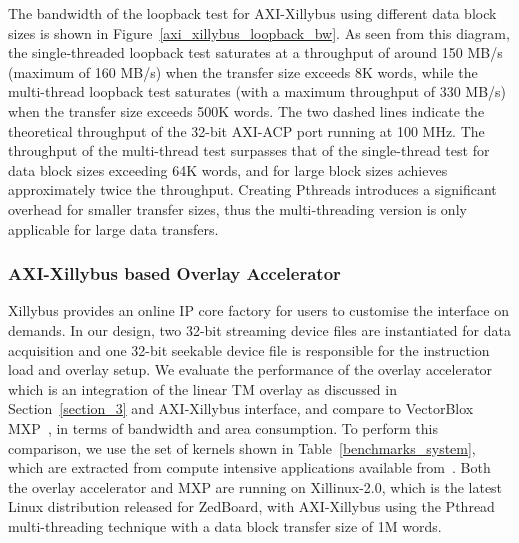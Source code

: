 The bandwidth of the loopback test for AXI-Xillybus using different data block sizes is shown in Figure~\ref{axi_xillybus_loopback_bw}. 
As seen from this diagram, the single-threaded loopback test saturates at a throughput of around 150 MB/s (maximum of 160 MB/s) when the transfer size exceeds 8K words, while the multi-thread loopback test saturates (with a maximum throughput of 330 MB/s) when the transfer size exceeds 500K words. 
The two dashed lines indicate the theoretical throughput of the 32-bit AXI-ACP port running at 100 MHz.
The throughput of the multi-thread test surpasses that of the single-thread test for data block sizes exceeding 64K words, and for large block sizes achieves approximately twice the throughput. 
Creating Pthreads introduces a significant overhead for smaller transfer sizes, thus the multi-threading version is only applicable for large data transfers. 



\subsubsection{AXI-Xillybus based Overlay Accelerator}
Xillybus provides an online IP core factory for users to customise the interface on demands.
In our design, two 32-bit streaming device files are instantiated for data acquisition and one 32-bit seekable device file is responsible for the instruction load and overlay setup. 
We evaluate the performance of the overlay accelerator which is an integration of the linear TM overlay as discussed in Section~\ref{section_3} and AXI-Xillybus interface, and compare to VectorBlox MXP~\cite{severance2013embedded}, in terms of bandwidth and area consumption. 
To perform this comparison, we use the set of kernels shown in Table~\ref{benchmarks_system}, which are extracted from compute intensive applications available from~\cite{gopalakrishnan2007finding, hoy2015performance}. 
Both the overlay accelerator and MXP are running on Xillinux-2.0, which is the latest Linux distribution released for ZedBoard, with AXI-Xillybus using the Pthread multi-threading technique with a data block transfer size of 1M words.

